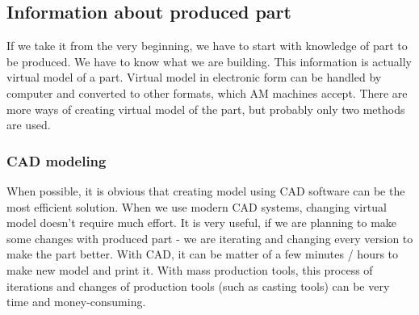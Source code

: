 \documentclass[a4paper, twoside, 11pt]{report}
\begin{document}
\subsection{Information about produced part}
If we take it from the very beginning, we have to start with knowledge of part to be produced. We have to know what we are building. This information is actually virtual model of a part. Virtual model in electronic form can be handled by computer and converted to other formats, which AM machines accept. There are more ways of creating virtual model of the part, but probably only two methods are used.
\subsubsection{CAD modeling}
When possible, it is obvious that creating model using CAD software can be the most efficient solution. When we use modern CAD systems, changing virtual model doesn't require much effort. It is very useful, if we are planning to make some changes with produced part - we are iterating and changing every version to make the part better. With CAD, it can be matter of a few minutes / hours to make new model and print it. With mass production tools, this process of iterations and changes of production tools (such as casting tools) can be very time and money-consuming.
\end{document}
